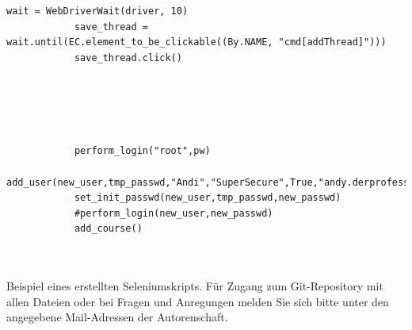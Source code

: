 \documentclass[10pt, a4paper,onecolumn ,titlepage]{article}
\begin{document}
\begin{lstlisting}[label={lst:SeleniumSkript}]
            wait = WebDriverWait(driver, 10)
            save_thread = wait.until(EC.element_to_be_clickable((By.NAME, "cmd[addThread]")))
            save_thread.click()





            perform_login("root",pw)
            add_user(new_user,tmp_passwd,"Andi","SuperSecure",True,"andy.derprofessor@email.com",True)
            set_init_passwd(new_user,tmp_passwd,new_passwd)
            #perform_login(new_user,new_passwd)
            add_course()



    \end{lstlisting} Beispiel eines erstellten Seleniumskripts.
    Für Zugang zum Git-Repository mit allen Dateien oder bei Fragen und Anregungen melden Sie sich bitte unter den angegebene Mail-Adressen der Autorenschaft.
\end{document}
